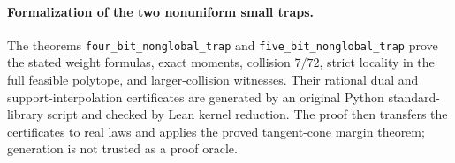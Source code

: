 \paragraph{Formalization of the two nonuniform small traps.} The theorems \texttt{four\_\allowbreak bit\_\allowbreak nonglobal\_\allowbreak trap} and \texttt{five\_\allowbreak bit\_\allowbreak nonglobal\_\allowbreak trap} prove the stated weight formulas, exact moments, collision $7/72$, strict locality in the full feasible polytope, and larger-collision witnesses. Their rational dual and support-interpolation certificates are generated by an original Python standard-library script and checked by Lean kernel reduction. The proof then transfers the certificates to real laws and applies the proved tangent-cone margin theorem; generation is not trusted as a proof oracle.
